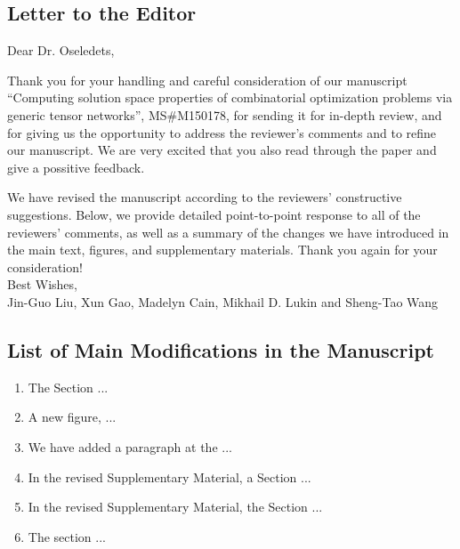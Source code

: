 \documentclass[longbibliography]{article}
\date{}
\begin{document}
\subsection{Letter to the Editor}\label{header-n558}

Dear Dr. Oseledets,

Thank you for your handling and careful consideration of our manuscript ``Computing solution space properties of combinatorial optimization problems via generic tensor networks'', MS\#M150178, for sending it for in-depth review, and for giving us the opportunity to address the reviewer's comments and to refine our manuscript. 
We are very excited that you also read through the paper and give a possitive feedback.

We have revised the manuscript according to the reviewers' constructive suggestions.
Below, we provide detailed point-to-point response to all of the reviewers' comments, as well as a summary of the changes we have introduced in the main text, figures, and supplementary materials. Thank you again for your consideration! \\

Best Wishes,\\
Jin-Guo Liu, Xun Gao, Madelyn Cain, Mikhail D. Lukin and Sheng-Tao Wang


\subsection{List of Main Modifications in the Manuscript}\label{header-n30}
\begin{enumerate}
\def\labelenumi{\arabic{enumi}.}
\item The Section ...
\item A new figure, ...
\item We have added a paragraph at the ...
\item In the revised Supplementary Material, a Section ...
\item In the revised Supplementary Material, the Section ...
\item The section ...
\end{enumerate}
\end{document}

